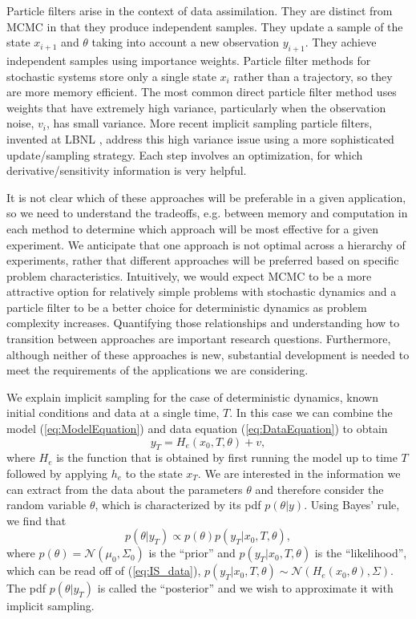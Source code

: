 \documentclass[11pt]{article}
\begin{document}
Particle filters arise in the context of data assimilation.
They are distinct from MCMC in that they produce independent samples.
They update a sample of the state $x_{i+1}$ and $\theta$ taking into account a new observation 
$y_{i+1}$.
They achieve independent samples using importance weights.
Particle filter methods for stochastic systems store only a single state $x_i$ rather than 
a trajectory, so they are more memory efficient.
The most common direct particle filter method uses weights that have extremely high variance, 
particularly when the observation noise, $v_i$, has small variance.
More recent implicit sampling particle filters, invented at LBNL
\cite{chorintupnas,chorin2010,Morzfeld2011,Morzfeld2012,Atkins2013}, address this high variance 
issue using a more sophisticated update/sampling strategy.
Each step involves an optimization, for which derivative/sensitivity information is very helpful.

It is not clear which of these approaches will be preferable in a given application, so
we need to understand the tradeoffs, e.g. between memory and computation
in each method to determine which approach will be most effective for a given experiment.
We anticipate that one approach is not optimal across a hierarchy of experiments, rather
that different approaches will be preferred based on specific problem characteristics. Intuitively,
we would expect MCMC to be a more attractive option for relatively simple problems with stochastic dynamics and a particle
filter to be a better choice for deterministic dynamics as problem complexity increases. Quantifying those relationships
and understanding how to transition between approaches are important research questions.
Furthermore, although neither of these approaches is new, substantial development is needed to meet the requirements
of the applications we are considering.

We explain implicit sampling for the case of deterministic dynamics, known initial conditions and 
data at a single time, $T$.
In this case we can combine the model (\ref{eq:ModelEquation}) and data equation (\ref{eq:DataEquation}) to obtain
\begin{equation}
\label{eq:IS_data}
	y_T = H_e(x_0,T,\theta)+v,
\end{equation}
where $H_e$ is the function that is obtained by first running the model up
to time $T$ followed by applying $h_e$ to the state $x_T$. We are interested in the information we can extract from the data about the parameters $\theta$ and
therefore consider the random variable $\theta$, which is characterized by its pdf $p(\theta|y)$. Using Bayes' rule, we find that
\begin{equation}
\label{eq:post}
	p(\theta|y_T) \propto p(\theta)p(y_T|x_0,T,\theta),
\end{equation}
where  $p(\theta) = \mathcal{N}(\mu_0,\Sigma_0)$ is the ``prior'' and $p(y_T|x_0,T,\theta)$ is the ``likelihood'',
which can be read off of (\ref{eq:IS_data}), $p(y_T|x_0,T,\theta)\sim \mathcal{N}(H_e(x_0,\theta),\Sigma)$.
The pdf $p(\theta|y_T)$  is called the ``posterior'' and we wish to approximate it with implicit sampling. 
\end{document}

